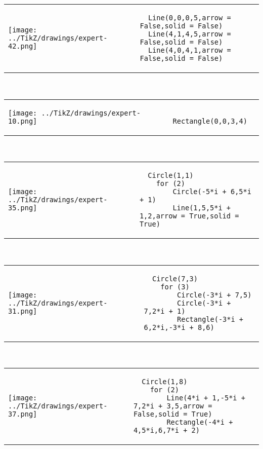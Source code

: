         \begin{tabular}{ll}
\texttt{[image: ../TikZ/drawings/expert-42.png]}&
        \begin{minipage}{10cm}
        \begin{verbatim}
  Line(0,0,0,5,arrow = False,solid = False)
  Line(4,1,4,5,arrow = False,solid = False)
  Line(4,0,4,1,arrow = False,solid = False)
        \end{verbatim}
\end{minipage}
\end{tabular}        
        \\

        \begin{tabular}{ll}
\texttt{[image: ../TikZ/drawings/expert-10.png]}&
        \begin{minipage}{10cm}
        \begin{verbatim}
  Rectangle(0,0,3,4)
        \end{verbatim}
\end{minipage}
\end{tabular}        
        \\

        \begin{tabular}{ll}
\texttt{[image: ../TikZ/drawings/expert-35.png]}&
        \begin{minipage}{10cm}
        \begin{verbatim}
  Circle(1,1)
    for (2)
        Circle(-5*i + 6,5*i + 1)
        Line(1,5,5*i + 1,2,arrow = True,solid = True)
        \end{verbatim}
\end{minipage}
\end{tabular}        
        \\

        \begin{tabular}{ll}
\texttt{[image: ../TikZ/drawings/expert-31.png]}&
        \begin{minipage}{10cm}
        \begin{verbatim}
  Circle(7,3)
    for (3)
        Circle(-3*i + 7,5)
        Circle(-3*i + 7,2*i + 1)
        Rectangle(-3*i + 6,2*i,-3*i + 8,6)
        \end{verbatim}
\end{minipage}
\end{tabular}        
        \\

        \begin{tabular}{ll}
\texttt{[image: ../TikZ/drawings/expert-37.png]}&
        \begin{minipage}{10cm}
        \begin{verbatim}
  Circle(1,8)
    for (2)
        Line(4*i + 1,-5*i + 7,2*i + 3,5,arrow = False,solid = True)
        Rectangle(-4*i + 4,5*i,6,7*i + 2)
        \end{verbatim}
\end{minipage}
\end{tabular}        
        \\

